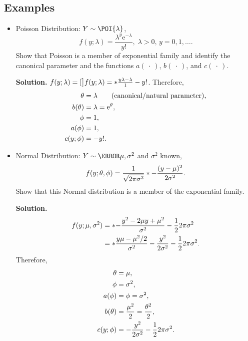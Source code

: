 \documentclass[oneside]{book}\usepackage[]{graphicx}\usepackage[svgnames]{xcolor}
\let\exp\relax%
\let\log\relax%
\begin{document}
\subsection*{Examples}
\begin{itemize}
      \item Poisson Distribution: $ Y \sim \POI{\lambda} $,
            \[ f(y;\lambda)=\frac{\lambda^y \mathrm{e}^{-\lambda}}{y!},\; \lambda>0,\, y=0,1,\ldots.  \]
            Show that Poisson is a member of exponential family and identify the canonical
            parameter and the functions $ a(\:\cdot\:) $, $ b(\:\cdot\:) $, and $ c(\:\cdot\:) $.

            \textbf{Solution.} $ f(y;\lambda)=\exp[\big]{\log{f(y;\lambda)}}=\exp*{\frac{y\log{\lambda}-\lambda}{1} -\log{y!}} $. Therefore,
            \begin{align*}
                  \theta    & =\log{\lambda}\qquad\text{(canonical/natural parameter)}, \\
                  b(\theta) & =\lambda=\mathrm{e}^{\theta},                             \\
                  \phi      & =1,                                                       \\
                  a(\phi)   & =1,                                                       \\
                  c(y;\phi) & =-\log{y!}.
            \end{align*}
      \item Normal Distribution: $ Y \sim \N{\mu,\sigma^2} $ and $ \sigma^2 $ known,
            \[ f(y;\theta,\phi)=\frac{1}{\sqrt{2\pi\sigma^2}}\exp*{-\frac{(y-\mu)^2}{2\sigma^2}}. \]
            Show that this Normal distribution is a member of the exponential family.

            \textbf{Solution.}
            \begin{align*}
                  f(y;\mu,\sigma^2)
                   & =\exp*{-\frac{y^2-2\mu y+\mu^2}{\sigma^2}-\frac{1}{2} \log{2\pi\sigma^2}}                   \\
                   & =\exp*{\frac{y\mu-\mu^2/2}{\sigma^2}-\frac{y^2}{2\sigma^2}-\frac{1}{2} \log{2\pi\sigma^2}}.
            \end{align*}
            Therefore,
            \begin{align*}
                  \theta    & =\mu,                                                   \\
                  \phi      & =\sigma^2,                                              \\
                  a(\phi)   & =\phi=\sigma^2,                                         \\
                  b(\theta) & =\frac{\mu^2}{2}=\frac{\theta^2}{2},                    \\
                  c(y;\phi) & =-\frac{y^2}{2\sigma^2}-\frac{1}{2} \log{2\pi\sigma^2}.
            \end{align*}
\end{itemize}
\end{document}
